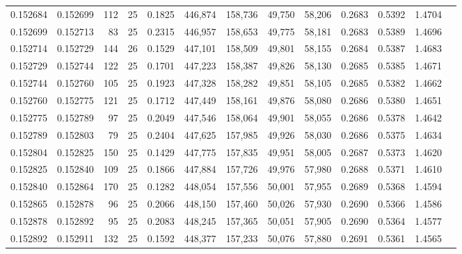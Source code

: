 \begin{tabular}{rrrrrrrrrrrrr}
0.152684 & 0.152699 &   112 &  25 &                                     0.1825 & 446,874 & 158,736 &  49,750 &  58,206 & 0.2683 & 0.5392 & 1.4704 \\
0.152699 & 0.152713 &    83 &  25 &                                     0.2315 & 446,957 & 158,653 &  49,775 &  58,181 & 0.2683 & 0.5389 & 1.4696 \\
0.152714 & 0.152729 &   144 &  26 &                                     0.1529 & 447,101 & 158,509 &  49,801 &  58,155 & 0.2684 & 0.5387 & 1.4683 \\
0.152729 & 0.152744 &   122 &  25 &                                     0.1701 & 447,223 & 158,387 &  49,826 &  58,130 & 0.2685 & 0.5385 & 1.4671 \\
0.152744 & 0.152760 &   105 &  25 &                                     0.1923 & 447,328 & 158,282 &  49,851 &  58,105 & 0.2685 & 0.5382 & 1.4662 \\
0.152760 & 0.152775 &   121 &  25 &                                     0.1712 & 447,449 & 158,161 &  49,876 &  58,080 & 0.2686 & 0.5380 & 1.4651 \\
0.152775 & 0.152789 &    97 &  25 &                                     0.2049 & 447,546 & 158,064 &  49,901 &  58,055 & 0.2686 & 0.5378 & 1.4642 \\
0.152789 & 0.152803 &    79 &  25 &                                     0.2404 & 447,625 & 157,985 &  49,926 &  58,030 & 0.2686 & 0.5375 & 1.4634 \\
0.152804 & 0.152825 &   150 &  25 &                                     0.1429 & 447,775 & 157,835 &  49,951 &  58,005 & 0.2687 & 0.5373 & 1.4620 \\
0.152825 & 0.152840 &   109 &  25 &                                     0.1866 & 447,884 & 157,726 &  49,976 &  57,980 & 0.2688 & 0.5371 & 1.4610 \\
0.152840 & 0.152864 &   170 &  25 &                                     0.1282 & 448,054 & 157,556 &  50,001 &  57,955 & 0.2689 & 0.5368 & 1.4594 \\
0.152865 & 0.152878 &    96 &  25 &                                     0.2066 & 448,150 & 157,460 &  50,026 &  57,930 & 0.2690 & 0.5366 & 1.4586 \\
0.152878 & 0.152892 &    95 &  25 &                                     0.2083 & 448,245 & 157,365 &  50,051 &  57,905 & 0.2690 & 0.5364 & 1.4577 \\
0.152892 & 0.152911 &   132 &  25 &                                     0.1592 & 448,377 & 157,233 &  50,076 &  57,880 & 0.2691 & 0.5361 & 1.4565 \\

\end{tabular}
